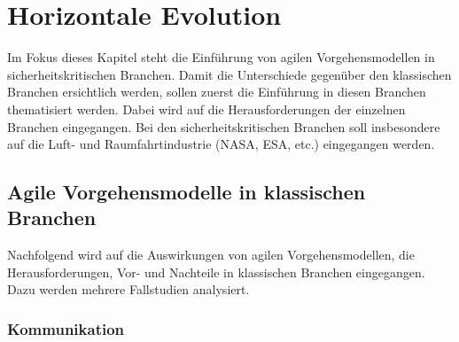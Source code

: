\chapter{Horizontale Evolution} %

Im Fokus dieses Kapitel steht die Einführung von agilen Vorgehensmodellen in sicherheitskritischen Branchen.
Damit die Unterschiede gegenüber den klassischen Branchen ersichtlich werden, sollen zuerst die Einführung in diesen Branchen thematisiert werden.
Dabei wird auf die Herausforderungen der einzelnen Branchen eingegangen.
Bei den sicherheitskritischen Branchen soll insbesondere auf die Luft- und Raumfahrtindustrie (NASA, ESA, etc.) eingegangen werden.

\section{Agile Vorgehensmodelle in klassischen Branchen} %

Nachfolgend wird auf die Auswirkungen von agilen Vorgehensmodellen, die Herausforderungen, Vor- und Nachteile in klassischen Branchen eingegangen.
Dazu werden mehrere Fallstudien analysiert.

\subsection{Kommunikation} %

